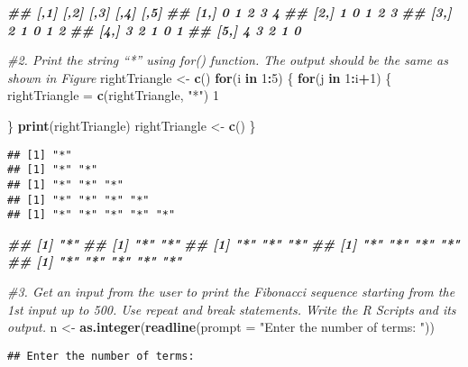 \documentclass[
]{article}
\newenvironment{Shaded}{\begin{snugshade}}{\end{snugshade}}
\newcommand{\AttributeTok}[1]{\textcolor[rgb]{0.13,0.29,0.53}{#1}}
\newcommand{\CommentTok}[1]{\textcolor[rgb]{0.56,0.35,0.01}{\textit{#1}}}
\newcommand{\ControlFlowTok}[1]{\textcolor[rgb]{0.13,0.29,0.53}{\textbf{#1}}}
\newcommand{\DecValTok}[1]{\textcolor[rgb]{0.00,0.00,0.81}{#1}}
\newcommand{\DocumentationTok}[1]{\textcolor[rgb]{0.56,0.35,0.01}{\textbf{\textit{#1}}}}
\newcommand{\FunctionTok}[1]{\textcolor[rgb]{0.13,0.29,0.53}{\textbf{#1}}}
\newcommand{\NormalTok}[1]{#1}
\newcommand{\OtherTok}[1]{\textcolor[rgb]{0.56,0.35,0.01}{#1}}
\newcommand{\SpecialCharTok}[1]{\textcolor[rgb]{0.81,0.36,0.00}{\textbf{#1}}}
\newcommand{\StringTok}[1]{\textcolor[rgb]{0.31,0.60,0.02}{#1}}
\begin{document}
\begin{Shaded}
\begin{Highlighting}[]
\DocumentationTok{\#\# [,1] [,2] [,3] [,4] [,5]}
\DocumentationTok{\#\# [1,] 0 1 2 3 4}
\DocumentationTok{\#\# [2,] 1 0 1 2 3}
\DocumentationTok{\#\# [3,] 2 1 0 1 2}
\DocumentationTok{\#\# [4,] 3 2 1 0 1}
\DocumentationTok{\#\# [5,] 4 3 2 1 0}

\CommentTok{\#2. Print the string “*” using for() function. The output should be the same as shown in Figure}
\NormalTok{rightTriangle }\OtherTok{\textless{}{-}} \FunctionTok{c}\NormalTok{()}
\ControlFlowTok{for}\NormalTok{(i }\ControlFlowTok{in} \DecValTok{1}\SpecialCharTok{:}\DecValTok{5}\NormalTok{) \{}
\ControlFlowTok{for}\NormalTok{(j }\ControlFlowTok{in} \DecValTok{1}\SpecialCharTok{:}\NormalTok{i}\SpecialCharTok{+}\DecValTok{1}\NormalTok{) \{}
\NormalTok{rightTriangle }\OtherTok{=} \FunctionTok{c}\NormalTok{(rightTriangle, }\StringTok{"*"}\NormalTok{)}
\DecValTok{1}

\NormalTok{\}}
\FunctionTok{print}\NormalTok{(rightTriangle)}
\NormalTok{rightTriangle }\OtherTok{\textless{}{-}} \FunctionTok{c}\NormalTok{()}
\NormalTok{\}}
\end{Highlighting}
\end{Shaded}

\begin{verbatim}
## [1] "*"
## [1] "*" "*"
## [1] "*" "*" "*"
## [1] "*" "*" "*" "*"
## [1] "*" "*" "*" "*" "*"
\end{verbatim}

\begin{Shaded}
\begin{Highlighting}[]
\DocumentationTok{\#\# [1] "*"}
\DocumentationTok{\#\# [1] "*" "*"}
\DocumentationTok{\#\# [1] "*" "*" "*"}
\DocumentationTok{\#\# [1] "*" "*" "*" "*"}
\DocumentationTok{\#\# [1] "*" "*" "*" "*" "*"}

\CommentTok{\#3. Get an input from the user to print the Fibonacci sequence starting from the 1st input up to 500. Use repeat and break statements. Write the R Scripts and its output.}
\NormalTok{n }\OtherTok{\textless{}{-}} \FunctionTok{as.integer}\NormalTok{(}\FunctionTok{readline}\NormalTok{(}\AttributeTok{prompt =} \StringTok{"Enter the number of terms: "}\NormalTok{))}
\end{Highlighting}
\end{Shaded}

\begin{verbatim}
## Enter the number of terms:
\end{verbatim}
\end{document}
